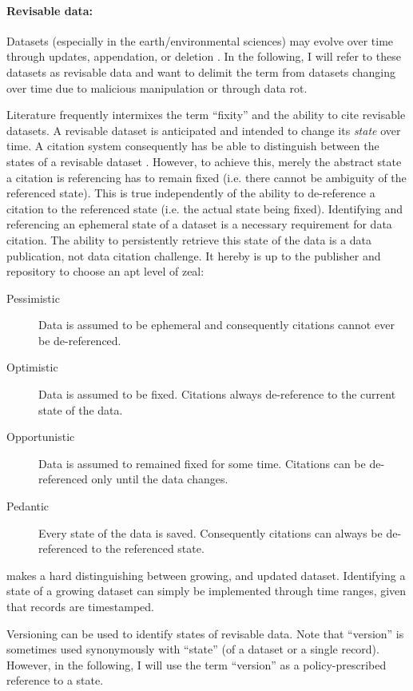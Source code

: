 \documentclass[a4paper,10pt]{article}
\begin{document}
\paragraph{Revisable data:}
Datasets (especially in the earth/environmental sciences) may evolve over time through updates, appendation, or deletion \citep{Klump2016}. In the following, I will refer to these datasets as revisable data and want to delimit the term from datasets changing over time due to malicious manipulation or through data rot.

Literature frequently intermixes the term ``fixity'' and the ability to cite revisable datasets. A revisable dataset is anticipated and intended to change its \textit{state} over time. A citation system consequently has be able to distinguish between the states of a revisable dataset \citep{Rauber2015, Klump2016}. However, to achieve this, merely the abstract state a citation is referencing has to remain fixed (i.e. there cannot be ambiguity of the referenced state).
This is true independently of the ability to de-reference a citation to the referenced state (i.e. the actual state being fixed). Identifying and referencing an ephemeral state of a dataset is a necessary requirement for data citation. The ability to persistently retrieve this state of the data is a data publication, not data citation challenge. It hereby is up to the publisher and repository to choose an apt level of zeal:

\begin{description}
  \item[Pessimistic] Data is assumed to be ephemeral and consequently citations cannot ever be de-referenced.
  \item[Optimistic] Data is assumed to be fixed. Citations always de-reference to the current state of the data.
  \item[Opportunistic] Data is assumed to remained fixed for some time. Citations can be de-referenced only until the data changes.
  \item[Pedantic] Every state of the data is saved. Consequently citations can always be de-referenced to the referenced state.  
\end{description}

\citep{Klump2016} makes a hard distinguishing between growing, and updated dataset. Identifying a state of a growing dataset can simply be implemented through time ranges, given that records are timestamped. 

Versioning can be used to identify states of revisable data. Note that ``version'' is sometimes used synonymously with ``state'' (of a dataset or a single record). However, in the following, I will use the term ``version'' as a policy-prescribed reference to a state.
\end{document}
